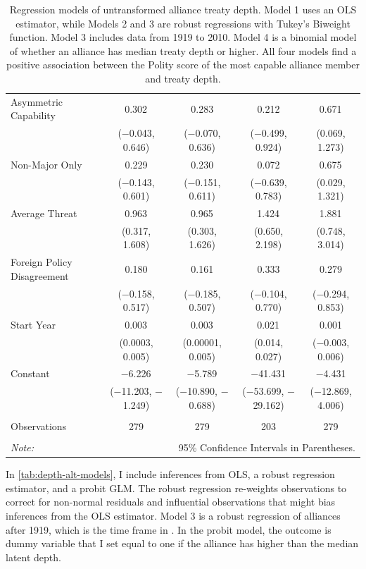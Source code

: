 \documentclass[12pt]{article}
\begin{document}
\begin{table}[!htbp]
\begin{adjustbox}{width= .95\textwidth, center}
\begin{tabular}{@{\extracolsep{5pt}}lcccc}
  Asymmetric Capability & 0.302$^{}$ & 0.283 & 0.212 & 0.671$^{}$ \\ 
  & ($-$0.043, 0.646) & ($-$0.070, 0.636) & ($-$0.499, 0.924) & (0.069, 1.273) \\ 
  Non-Major Only & 0.229 & 0.230 & 0.072 & 0.675$^{}$ \\ 
  & ($-$0.143, 0.601) & ($-$0.151, 0.611) & ($-$0.639, 0.783) & (0.029, 1.321) \\ 
  Average Threat & 0.963$^{}$ & 0.965$^{}$ & 1.424$^{}$ & 1.881$^{}$ \\ 
  & (0.317, 1.608) & (0.303, 1.626) & (0.650, 2.198) & (0.748, 3.014) \\ 
  Foreign Policy Disagreement & 0.180 & 0.161 & 0.333 & 0.279 \\ 
  & ($-$0.158, 0.517) & ($-$0.185, 0.507) & ($-$0.104, 0.770) & ($-$0.294, 0.853) \\ 
  Start Year & 0.003$^{}$ & 0.003$^{}$ & 0.021$^{}$ & 0.001 \\ 
  & (0.0003, 0.005) & (0.00001, 0.005) & (0.014, 0.027) & ($-$0.003, 0.006) \\ 
  Constant & $-$6.226$^{}$ & $-$5.789$^{}$ & $-$41.431$^{}$ & $-$4.431 \\ 
  & ($-$11.203, $-$1.249) & ($-$10.890, $-$0.688) & ($-$53.699, $-$29.162) & ($-$12.869, 4.006) \\ 
 \hline \\[-1.8ex] 
Observations & 279 & 279 & 203 & 279 \\ 
\hline 
\hline \\[-1.8ex] 
\textit{Note:}  & \multicolumn{4}{r}{95\% Confidence Intervals in Parentheses.} \\ 
\end{tabular}
\end{adjustbox} 
  \caption{Regression models of untransformed alliance treaty depth. Model 1 uses an OLS estimator, while Models 2 and 3 are robust regressions with Tukey's Biweight function. Model 3 includes data from 1919 to 2010. Model 4 is a binomial model of whether an alliance has median treaty depth or higher. All four models find a positive association between the Polity score of the most capable alliance member and treaty depth.} 
  \label{tab:depth-alt-models} 
\end{table} 


In \autoref{tab:depth-alt-models}, I include inferences from OLS, a robust regression estimator, and a probit GLM. 
The robust regression re-weights observations to correct for non-normal residuals and influential observations that might bias inferences from the OLS estimator. 
Model 3 is a robust regression of alliances after 1919, which is the time frame in \citet{Mattes2012}. 
In the probit model, the outcome is dummy variable that I set equal to one if the alliance has higher than the median latent depth. 
\end{document}

